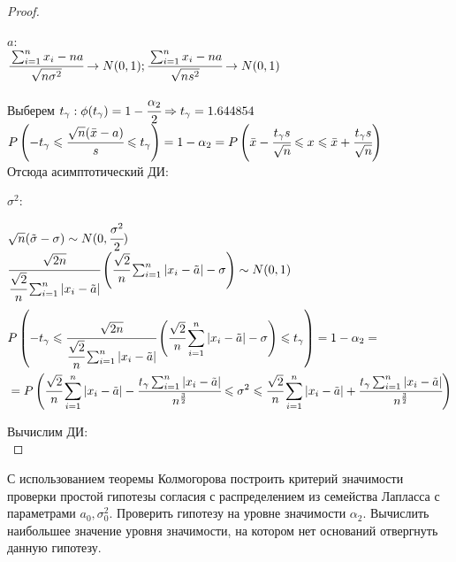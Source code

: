 \begin{proof}
	$ $
	
	$a$: \\

		$\cfrac{\sum_{i=1}^nx_i-na}{\sqrt{n\sigma^2}}\rightarrow N(0, 1); \cfrac{\sum_{i=1}^nx_i-na}{\sqrt{ns^2}}\rightarrow N(0, 1)$


	Выберем $t_{\gamma}: \phi(t_{\gamma})=1-\cfrac{\alpha_2}2\Rightarrow t_{\gamma}=1.644854$ \\

		$P\left(-t_{\gamma} \leqslant \cfrac{\sqrt{n}(\bar{x}-a)}{s} \leqslant t_{\gamma}\right)=1-\alpha_2=P\left(\bar{x}-\cfrac{t_{\gamma} s}{\sqrt{n}}\leqslant x \leqslant \bar{x}+\cfrac{t_{\gamma} s}{\sqrt{n}}\right)$ \\

	Отсюда асимптотический ДИ:
	\begin{equation}
		[1.662361, 6.292439]
	\end{equation}

	$\sigma^2$:

		$\sqrt{n}(\tilde{\sigma}-\sigma)\sim N(0, \cfrac{\sigma^2}{2})$ \\
	
		$\cfrac{\sqrt{2n}}{\cfrac{\sqrt{2}}{n}\sum_{i=1}^n|x_i-\tilde{a}|}\left(\cfrac{\sqrt{2}}{n}\sum_{i=1}^n|x_i-\tilde{a}|-\sigma\right)\sim N(0, 1)$ \\

	\begin{align}
		& P\left(-t_{\gamma} \leqslant \cfrac{\sqrt{2n}}{\cfrac{\sqrt{2}}{n}\sum_{i=1}^n|x_i-\tilde{a}|}\left(\cfrac{\sqrt{2}}{n}\sum_{i=1}^n|x_i-\tilde{a}|-\sigma\right) \leqslant t_{\gamma}\right) = 1-\alpha_2 = \\
		& = P\left(\cfrac{\sqrt{2}}{n}\sum_{i=1}^n|x_i-\tilde{a}|-\cfrac{t_{\gamma}\sum_{i=1}^n|x_i-\tilde{a}|}{n^{\frac32}} \leqslant \sigma^2 \leqslant \cfrac{\sqrt{2}}{n}\sum_{i=1}^n|x_i-\tilde{a}|+\cfrac{t_{\gamma}\sum_{i=1}^n|x_i-\tilde{a}|}{n^{\frac32}} \right)
	\end{align}

	Вычислим ДИ:
	\begin{equation}
		[81.23379, 157.79624]
	\end{equation}
\end{proof}


\begin{problem}
	С использованием теоремы Колмогорова построить критерий значимости проверки простой гипотезы согласия с распределением из семейства Лапласса с параметрами $a_0, \sigma_0^2$. Проверить гипотезу на уровне значимости $\alpha_2$. Вычислить наибольшее значение уровня значимости, на котором нет оснований отвергнуть данную гипотезу.
\end{problem}

